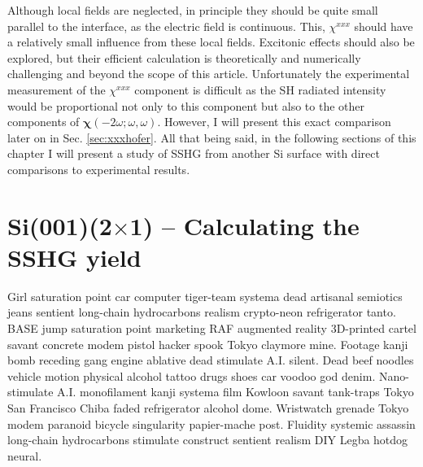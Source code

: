\documentclass[11pt]{book}
\begin{document}
Although local fields are neglected, in principle they should be quite small
parallel to the interface, as the electric field is continuous. This,
$\chi^{xxx}$ should have a relatively small influence from these local fields.
Excitonic effects should also be explored, but their efficient calculation is
theoretically and numerically challenging \cite{beyond} and beyond the scope of
this article. Unfortunately the experimental measurement of the $\chi^{xxx}$
component is difficult as the SH radiated intensity would be proportional not
only to this component but also to the other components of
$\boldsymbol{\chi}(-2\omega;\omega,\omega)$. However, I will present this exact
comparison later on in Sec. \ref{sec:xxxhofer}. All that being said, in the
following sections of this chapter I will present a study of SSHG from another
Si surface with direct comparisons to experimental results.



\section{\texorpdfstring{Si(001)(2$\times$1)}{Si(001)(2x1)} -- Calculating the 
SSHG yield}

Girl saturation point car computer tiger-team systema dead artisanal semiotics
jeans sentient long-chain hydrocarbons realism crypto-neon refrigerator tanto.
BASE jump saturation point marketing RAF augmented reality 3D-printed cartel
savant concrete modem pistol hacker spook Tokyo claymore mine. Footage kanji
bomb receding gang engine ablative dead stimulate A.I. silent. Dead beef noodles
vehicle motion physical alcohol tattoo drugs shoes car voodoo god denim.
Nano-stimulate A.I. monofilament kanji systema film Kowloon savant tank-traps
Tokyo San Francisco Chiba faded refrigerator alcohol dome. Wristwatch grenade
Tokyo modem paranoid bicycle singularity papier-mache post. Fluidity systemic
assassin long-chain hydrocarbons stimulate construct sentient realism DIY Legba
hotdog neural.
\end{document}
